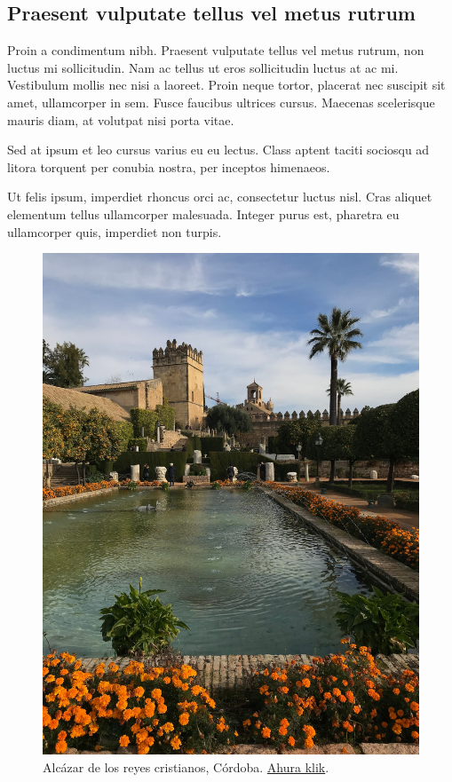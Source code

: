 \subsection{Praesent vulputate tellus vel metus rutrum}

Proin a condimentum nibh. Praesent vulputate tellus vel metus rutrum, non luctus mi sollicitudin. Nam ac tellus ut eros sollicitudin luctus at ac mi. Vestibulum mollis nec nisi a laoreet. Proin neque tortor, placerat nec suscipit sit amet, ullamcorper in sem. Fusce faucibus ultrices cursus. Maecenas scelerisque mauris diam, at volutpat nisi porta vitae. 

Sed at ipsum et leo cursus varius eu eu lectus. Class aptent taciti sociosqu ad litora torquent per conubia nostra, per inceptos himenaeos. 

Ut felis ipsum, imperdiet rhoncus orci ac, consectetur luctus nisl. Cras aliquet elementum tellus ullamcorper malesuada. Integer purus est, pharetra eu ullamcorper quis, imperdiet non turpis. \cite{SOFTWARE_ENGINEERING_9}




\begin{figure}
    \centering
    \includegraphics[width=\linewidth]{figures/examples/Alcazar_Cordoba.jpg}
    \caption[Alcázar de los reyes cristianos, Córdoba.]{Alcázar de los reyes cristianos, Córdoba. \href{https://es.wikipedia.org/wiki/Archivo:Alcazar_Cordoba.jpg}{Ahura klik}.}
    \label{fig:apxA:cordoba}
\end{figure}



